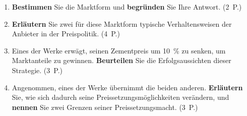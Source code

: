 \begin{enumerate}[label=\alph*)]
  \item \textbf{Bestimmen} Sie die Marktform und \textbf{begründen} Sie Ihre Antwort.
    \hfill (2~P.)
  \item \textbf{Erläutern} Sie zwei für diese Marktform typische Verhaltensweisen der
    Anbieter in der Preispolitik. \hfill (4~P.)
  \item Eines der Werke erwägt, seinen Zementpreis um 10~\% zu senken, um Marktanteile
    zu gewinnen. \textbf{Beurteilen} Sie die Erfolgsaussichten dieser Strategie.
    \hfill (3~P.)
  \item Angenommen, eines der Werke übernimmt die beiden anderen. \textbf{Erläutern} Sie,
    wie sich dadurch seine Preissetzungsmöglichkeiten verändern, und \textbf{nennen} Sie
    zwei Grenzen seiner Preissetzungsmacht. \hfill (3~P.)
\end{enumerate}
